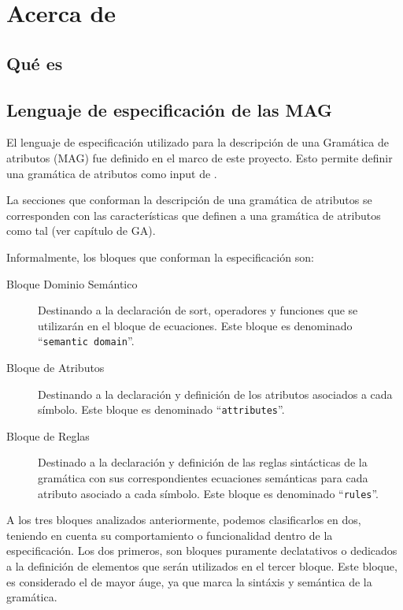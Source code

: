 \chapter{Acerca de \maggen}
\label{chap:disen_}
\minitoc

\section{Qu\'e es \maggen}

\section{Lenguaje de especificaci\'on de las MAG}

El lenguaje de especificación utilizado para la descripción de una Gramática de atributos (MAG) fue definido en el marco de este proyecto. Esto permite definir una gramática de atributos como input de \maggen.
 
La secciones que conforman la descripción de una gramática de atributos se corresponden con las características que definen a una gramática de atributos como tal (ver capítulo de GA).
 
Informalmente, los bloques que conforman la especificación son:

\begin{description}
\item [Bloque Dominio Semántico] Destinando a la declaración de sort, operadores y funciones que se utilizarán en el bloque de ecuaciones. Este bloque es denominado ``\texttt{semantic domain}''.
\item [Bloque de Atributos] Destinando a la declaración y definición de los atributos asociados a cada símbolo. Este bloque es denominado ``\texttt{attributes}''.
\item [Bloque de Reglas] Destinado a la declaración y definición de las reglas sintácticas de la gramática con sus correspondientes ecuaciones semánticas para cada atributo asociado a cada símbolo. Este bloque es denominado ``\texttt{rules}''.
\end{description}

A los tres bloques analizados anteriormente, podemos clasificarlos en dos, teniendo en cuenta su comportamiento o funcionalidad dentro de la especificación. Los dos primeros, son bloques puramente declatativos o dedicados a la definición de elementos que serán utilizados en el tercer bloque. Este bloque, es considerado el de mayor áuge, ya que marca la sintáxis y semántica de la gramática.

